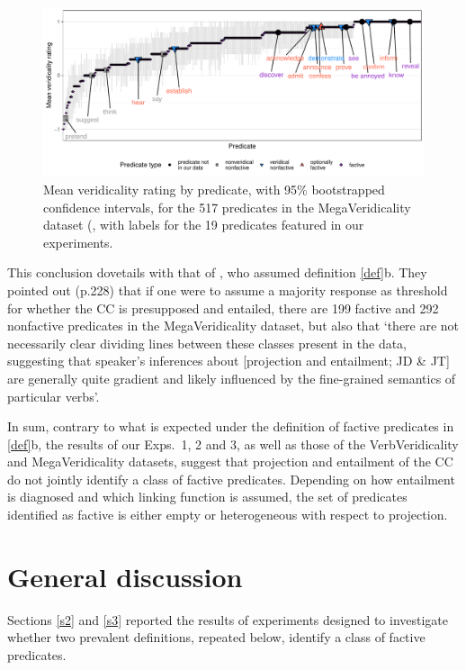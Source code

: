 \documentclass{language}
\newcommand{\6}{\mbox{$[\hspace*{-.6mm}[$}}
\newcommand{\9}{\mbox{$]\hspace*{-.6mm}]$}}
\begin{document}
\begin{figure}[H]
\centering
\includegraphics[width=.75\paperwidth]{Language-figures/color/Figure17.pdf}

\caption{Mean veridicality rating by predicate, with 95\% bootstrapped confidence intervals, for the 517 predicates in the MegaVeridicality dataset (\citealt{white-rawlins-nels2018,white-etal2018b}, with labels for the 19 predicates featured in our experiments.}
\label{f-white-rawlins-ent}
\end{figure}
 
 This conclusion dovetails with that of \citet{white-rawlins-nels2018}, who assumed definition \ref{def}b. They pointed out (p.228) that if one were to assume a majority response as threshold for whether the CC is presupposed and entailed, there are 199 factive and 292 nonfactive predicates in the MegaVeridicality dataset, but also that `there are not necessarily clear dividing lines between these classes present in the data, suggesting that speaker's inferences about [projection and entailment; JD \& JT] are generally quite gradient and likely influenced by the fine-grained semantics
of particular verbs'.

In sum, contrary to what is expected under the definition of factive predicates in \ref{def}b, the results of our Exps.~1, 2 and 3, as well as those of the VerbVeridicality and MegaVeridicality datasets, suggest that projection and entailment of the CC do not jointly identify a class of factive predicates. Depending on how entailment is diagnosed and which linking function is assumed, the set of predicates identified as factive is either empty or heterogeneous with respect to projection.

\section{General discussion}\label{s4}

Sections \ref{s2} and \ref{s3} reported the results of experiments designed to investigate whether two prevalent definitions, repeated below, identify a class of factive predicates. 
\end{document}
